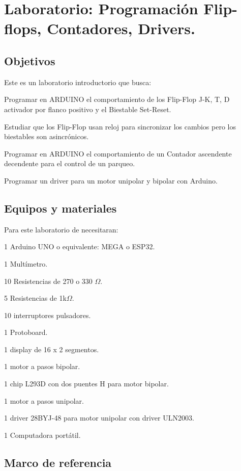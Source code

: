 \chapter{Laboratorio: Programación Flip-flops, Contadores, Drivers.}


\section{Objetivos}
Este es un laboratorio introductorio que busca:
\begin{itemize}
	{\small
	 \item  Programar en ARDUINO el comportamiento de los Flip-Flop J-K, T, D activador por flanco positivo y el Biestable Set-Reset.
	 \item  Estudiar que los Flip-Flop usan reloj para sincronizar los cambios pero los biestables son asincrónicos.
	 \item  Programar en ARDUINO el comportamiento de un Contador ascendente decendente para el control de un parqueo.
	 \item  Programar un driver para un motor unipolar y bipolar con Arduino.
 }
\end{itemize} 


\section{Equipos y materiales}
Para este laboratorio de necesitaran:
\begin{itemize}
	{\small \item 1 Arduino UNO o equivalente: MEGA o ESP32.
	\item 1 Multímetro.
	\item 10 Resistencias de 270 o 330 $\Omega$.
	\item 5 Resistencias de 1k$\Omega$.
	\item 10 interruptores pulsadores.
	\item 1 Protoboard.
	\item 1 display de 16 x 2 segmentos.
	\item 1 motor a pasos bipolar.
	\item 1 chip L293D con dos puentes H para motor bipolar.
	\item 1 motor a pasos unipolar. 
	\item 1 driver 28BYJ-48 para motor unipolar con driver  ULN2003.
	\item 1 Computadora portátil.}
\end{itemize}

\section{Marco de referencia}

